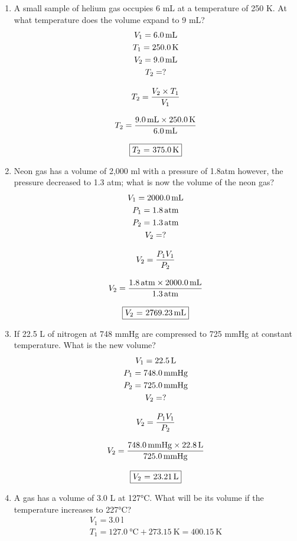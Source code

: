 \documentclass[12pt, a4paper]{article}
\begin{document}
\begin{enumerate}
	\item A small sample of helium gas occupies 6 mL at a temperature of 250 K. At what temperature does the volume expand to 9 mL?
		\begin{gather*}
		V_1 = \SI{6.0}{\ml}\\
		T_1 = \SI{250.0}{\kelvin}\\
		V_2 = \SI{9.0}{\ml}\\
		T_2 = ?\\[3mm]
		T_2 = \dfrac{V_2 \times T_1}{V_1}\\[3mm]
		T_2 = \dfrac{\SI{9.0}{\ml} \times \SI{250.0}{\kelvin}}{\SI{6.0}{\ml}}\\[3mm]
		\fbox{$T_2$ = \SI{375.0}{\kelvin}}
		\end{gather*}
	\item Neon gas has a volume of 2,000 ml with a pressure of 1.8atm however, the pressure decreased to 1.3 atm; what is now the volume of the neon gas?
		\begin{gather*}
		V_1 = \SI{2000.0}{\ml}\\
		P_1 = \SI{1.8}{atm}\\
		P_2 = \SI{1.3}{atm}\\
		V_2 = ?\\[3mm]
		V_2 = \dfrac{P_1 V_1}{P_2}\\[3mm]
		V_2 = \dfrac{\SI{1.8}{atm} \times \SI{2000.0}{\ml}}{\SI{1.3}{atm}}\\[3mm]
		\fbox{$V_2$ = \SI{2769.23}{\ml}}
		\end{gather*}
	\item If 22.5 L of nitrogen at 748 mmHg are compressed to 725 mmHg at constant temperature. What is the new volume?
		\begin{gather*}
		V_1 = \SI{22.5}{\l}\\
		P_1 = \SI{748.0}{\mmHg}\\
		P_2 = \SI{725.0}{\mmHg}\\
		V_2 = ?\\[3mm]
		V_2 = \dfrac{P_1 V_1}{P_2}\\[3mm]
		V_2 = \dfrac{\SI{748.0}{\mmHg} \times \SI{22.8}{\l}}{\SI{725.0}{\mmHg}}\\[3mm]
		\fbox{$V_2$ = \SI{23.21}{\l}} 
		\end{gather*}
	\item A gas has a volume of 3.0 L at 127°C. What will be its volume if the temperature increases to 227°C?
		\begin{gather*}
		V_1 = \SI{3.0}{\l}\\
		T_1 = \SI{127.0}{\celsius} + \SI{273.15}{\kelvin} = \SI{400.15}{\kelvin}\\

\end{gather*}
\end{enumerate}
\end{document}
